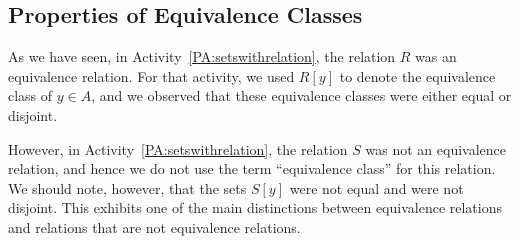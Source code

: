 \subsection*{Properties of Equivalence Classes}
As we have seen, in \typeu Activity~\ref*{PA:setswithrelation}, the relation  $R$  was an equivalence relation. For that activity, we used  $R[ y ]$ to denote the equivalence class of   $y \in A$, and we observed that these equivalence classes were either equal or disjoint.

However, in \typeu Activity~\ref*{PA:setswithrelation}, the relation  $S$  was not an equivalence relation, and hence we do not use the term ``equivalence class'' for this relation.  We should note, however, that the sets  $S[ y ]$ were not equal and were not disjoint.  This exhibits one of the main distinctions between equivalence relations and relations that are not equivalence relations.  

